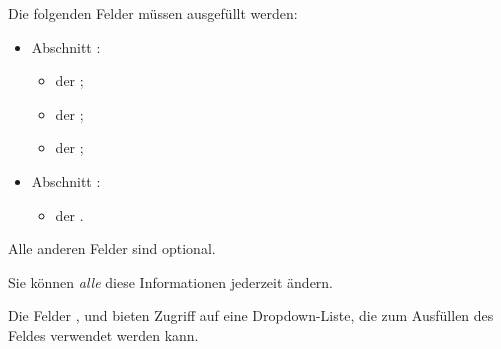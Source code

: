 Die folgenden Felder müssen ausgefüllt werden:
\begin{itemize}
	\item Abschnitt :
	\begin{itemize}
		\item der ;
		\item der ;
		\item der ;
	\end{itemize}
	\item Abschnitt :
	\begin{itemize}
		\item der .
	\end{itemize}
\end{itemize}
Alle anderen Felder sind optional.

Sie können \emph{alle} diese Informationen jederzeit ändern.

Die Felder ,  und  bieten Zugriff auf eine Dropdown-Liste, die zum Ausfüllen des Feldes verwendet werden kann.


